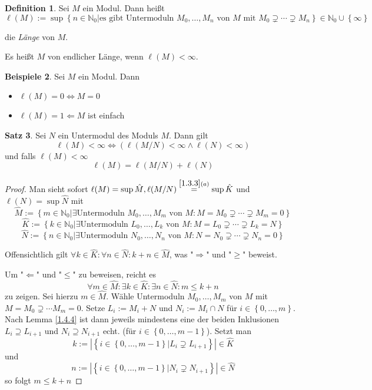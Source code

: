 \documentclass[
twoside=semi,
fontsize=12,
DIV=12, 
cleardoublepage=current,
leqno,
headings=optiontoheadandtoc, 
toc=idx
]{scrbook}
\newcommand{\N}{\mathbb{N}}
\newcommand{\brac}[1]{\left( #1 \right)}
\newcommand{\set}[1]{\left\{ #1 \right\}}
\theoremstyle{definition}
\newtheorem{definition}{Definition}[section]
\newtheorem{beispiele}[definition]{Beispiele}
\newtheorem{satz}[definition]{Satz}
\begin{document}
	\begin{definition}\label{1.4.8}
		Sei $M$ ein Modul. Dann heißt 
			\[\ell(M) := \sup \set{n \in \N_0| \textrm{es gibt Untermoduln } M_0, \dots, M_n \textrm{ von } M \textrm{ mit } M_0 \supsetneq \cdots \supsetneq M_n} \in \N_0 \cup \set{\infty}\]
		
		die \emph{L\"ange} von $M$.
	
		\noindent Es heißt $M$ von endlicher L\"ange, wenn $\ell(M) < \infty$.
	\end{definition}

	\begin{beispiele}\label{1.4.9}
		Sei $M$ ein Modul. Dann 
		\begin{itemize}
			\item $\ell(M) = 0 \Leftrightarrow M = 0$
			\item $\ell(M) = 1 \Leftarrow M$ ist einfach
		\end{itemize}
	\end{beispiele}

	\begin{satz}\label{1.4.10}
		Sei $N$ ein Untermodul des Moduls $M$. Dann gilt
			\[\ell(M) < \infty \Leftrightarrow \brac{\ell(M/N) < \infty \land \ell(N)< \infty}\]
		und falls $\ell(M) < \infty$
			\[\ell(M) = \ell(M/N) + \ell(N)\]
		
		\begin{proof}
			Man sieht sofort $\ell(M) = \sup \hat M, \ell(M/N) \overset{\ref{1.3.3}(a)}{=} \sup \hat{K}$ und $\ell(N) = \sup \hat N$ mit 
				\[\hat M := \set{m \in \N_0| \exists \textrm{Untermoduln } M_0, \dots, M_m \textrm{ von } M: M = M_0 \supsetneq \cdots \supsetneq M_m = 0}\]
				\[\hat K := \set{k \in \N_0| \exists \textrm{Untermoduln } L_0, \dots, L_k \textrm{ von } M: M = L_0 \supsetneq \cdots \supsetneq L_k = N}\]
				\[\hat N := \set{n \in \N_0| \exists \textrm{Untermoduln } N_0, \dots, N_n \textrm{ von } M: N = N_0 \supsetneq \cdots \supsetneq N_n = 0}\]
			
			Offensichtlich gilt $\forall k \in \hat K: \forall n \in \hat N: k + n \in \hat M$, was "$\Rightarrow$" und "$\geq$" beweist.
			
			\noindent Um "$\Leftarrow$" und "$\leq$" zu beweisen, reicht es 
				\[\forall m \in \hat M: \exists k \in \hat K: \exists n \in \hat N: m \leq k + n\]
			zu zeigen. Sei hierzu $m \in \hat M$. W\"ahle Untermoduln $M_0, \dots, M_m$ von $M$ mit $M=M_0 \supsetneq \cdots M_m = 0$.
			Setze $L_i := M_i + N$ und $N_i := M_i \cap N$ f\"ur $i \in \set{0, \dots, m}$. Nach Lemma \ref{1.4.4} ist dann jeweils mindestens eine der beiden Inklusionen $L_i \supseteq L_{i+1}$ und $N_i \supseteq N_{i+1}$ echt. (f\"ur $i \in \set{0, \dots, m-1}$). Setzt man
				\[k := |\set{i \in \set{0, \dots, m - 1}| L_i \supsetneq L_{i+1}}| \in \hat K\] und
				\[n := |\set{i \in \set{0, \dots, m - 1}| N_i \supsetneq N_{i+1}}| \in \hat N\]
			so folgt $m \leq k + n$ 
		\end{proof}
	\end{satz}
\end{document}
